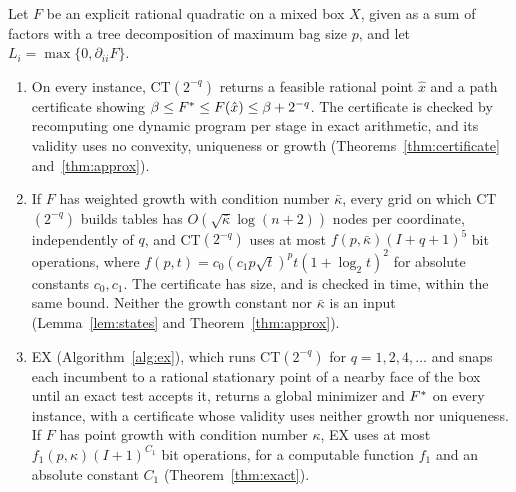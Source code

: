 \begin{theorem}\label{thm:intro-main}
Let $F$ be an explicit rational quadratic on a mixed box $X$, given as a sum
of factors with a tree decomposition of maximum bag size $p$, and let
$L_i=\max\{0,\partial_{ii}F\}$.
\begin{enumerate}[label=(\alph*)]
\item On every instance, CT$(2^{-q})$ returns a feasible rational point $\hat
x$ and a path certificate showing $\beta\le F^{*}\le F(\hat x)\le\beta+2^{-q}$.
The certificate is checked by recomputing one dynamic program per stage in
exact arithmetic, and its validity uses no convexity, uniqueness or growth
(Theorems~\ref{thm:certificate} and~\ref{thm:approx}).
\item If $F$ has weighted growth with condition number $\bar\kappa$, every grid
on which CT$(2^{-q})$ builds tables has $O(\sqrt{\bar\kappa}\log(n+2))$ nodes per
coordinate, independently of $q$, and CT$(2^{-q})$ uses at most
$f(p,\bar\kappa)(I+q+1)^5$ bit operations, where
$f(p,t)=c_0(c_1p\sqrt t)^pt(1+\log_2t)^2$ for absolute
constants $c_0,c_1$. The certificate has size, and is checked in time, within
the same bound. Neither the growth constant nor $\bar\kappa$ is an input
(Lemma~\ref{lem:states} and Theorem~\ref{thm:approx}).
\item EX (Algorithm~\ref{alg:ex}), which runs CT$(2^{-q})$ for
$q=1,2,4,\dots$ and snaps each incumbent to a rational stationary point of a
nearby face of the box until an exact test accepts it, returns a global
minimizer and $F^{*}$ on every instance, with a certificate
whose validity uses neither growth nor uniqueness. If $F$ has point growth
with condition number $\kappa$, EX uses at most $f_1(p,\kappa)(I+1)^{C_1}$
bit operations, for a computable function $f_1$ and an absolute constant
$C_1$ (Theorem~\ref{thm:exact}).
\end{enumerate}
\end{theorem}

